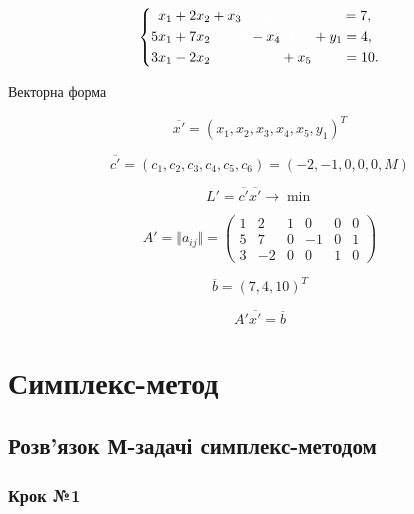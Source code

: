 \documentclass[a4paper, 12pt]{article}
\begin{document}
\[
\left\{
\begin{aligned}
	x_1 &+ 2x_2 + x_3 \textcolor{white}{+ 0x_4 + 0x_5 + y_1} = 7,\\
	5x_1 &+ 7x_2 \textcolor{white}{+ 0x_33} - x_4 \textcolor{white}{+ 0x_5} + y_1 = 4,\\
	3x_1 &- 2x_2 \textcolor{white}{+ 0x_3 + 0x_4} + x_5 \textcolor{white}{+ 0y_1} = 10.\\ 
\end{aligned}
\right.
\]

Векторна форма

\begin{equation*}
\overline{x'} = \left(x_1, x_2, x_3, x_4, x_5, y_1\right)^T
\end{equation*}

\begin{equation*}
\overline{c'} = \left(c_1, c_2, c_3, c_4, c_5, c_6\right) = (-2,-1,0,0,0, M)
\end{equation*}

\begin{equation*}
L' = \overline{c'}\overline{x'} \rightarrow \min
\end{equation*}

\begin{equation*}
A' = \Vert a_{ij} \Vert = 
\begin{pmatrix}
	1 & 2 & 1 & 0 & 0 & 0\\
	5 & 7 & 0 & -1 & 0 & 1\\
	3 & -2 & 0 & 0 & 1 & 0
\end{pmatrix}
\end{equation*}

\begin{equation*}
 \overline{b} = \left( 7, 4, 10 \right)^T
\end{equation*}

\begin{equation*}
 A'\overline{x'} = \overline{b}
\end{equation*}


\section{Симплекс-метод}

\subsection{Розв'язок М-задачі симплекс-методом}

\subsubsection{Крок №1}
\end{document}

